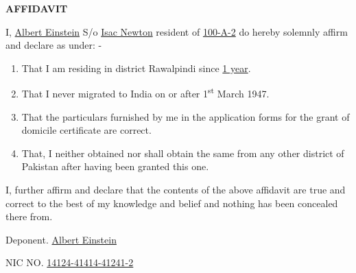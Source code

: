 \documentclass{article}
\begin{document}
\begin{center}
\textbf{\Large AFFIDAVIT}
\end{center}

I, \underline{Albert Einstein} S/o \underline{Isac Newton} resident of \underline{100-A-2} do hereby solemnly affirm and declare as under: -

\begin{enumerate}
    \item That I am residing in district Rawalpindi since \underline{1 year}.
    \item That I never migrated to India on or after 1\textsuperscript{st} March 1947.
    \item That the particulars furnished by me in the application forms for the grant of domicile certificate are correct.
    \item That, I neither obtained nor shall obtain the same from any other district of Pakistan after having been granted this one.
\end{enumerate}

I, further affirm and declare that the contents of the above affidavit are true and correct to the best of my knowledge and belief and nothing has been concealed there from.

\vspace{1cm}

Deponent. \underline{Albert Einstein}

NIC NO. \underline{14124-41414-41241-2}
\end{document}
